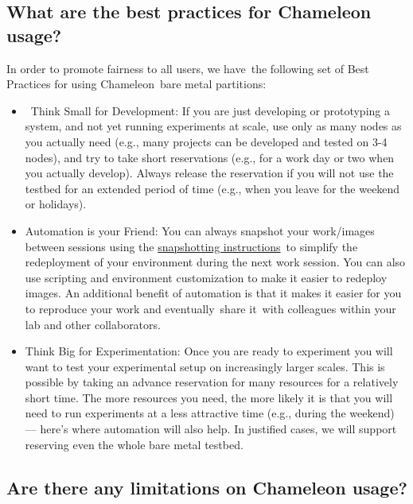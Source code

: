 \subsection{What are the best practices for Chameleon
usage?}\label{what-are-the-best-practices-for-chameleon-usage}

In order to promote fairness to all users, we have~the following set of
Best Practices for using Chameleon~bare metal partitions:

\begin{itemize}
\tightlist
\item
  ~Think Small for Development: If you are just developing or
  prototyping a system, and not yet running experiments at scale, use
  only as many nodes as you actually need (e.g., many projects can be
  developed and tested on 3-4 nodes), and try to take short reservations
  (e.g., for a work day or two when you actually develop). Always
  release the reservation if you will not use the testbed for an
  extended period of time (e.g., when you leave for the weekend or
  holidays).~
\item
  Automation is your Friend: You can always snapshot your work/images
  between sessions using the
  \href{https://www.chameleoncloud.org/docs/user-guides/ironic/\#snapshotting_an_instance}{snapshotting
  instructions}~to simplify the redeployment of your environment during
  the next work session. You can also use scripting and environment
  customization to make it easier to redeploy images. An additional
  benefit of automation is that it makes it easier for you to reproduce
  your work and eventually~share it~with colleagues within your lab and
  other collaborators.
\item
  Think Big for Experimentation: Once you are ready to experiment you
  will want to test your experimental setup on increasingly larger
  scales. This is possible by taking an advance reservation for many
  resources for a relatively short time. The more resources you need,
  the more likely it is that you will need to run experiments at a less
  attractive time (e.g., during the weekend) --- here's where automation
  will also help. In justified cases, we will support reserving even the
  whole bare metal testbed.
\end{itemize}

\subsection{Are there any limitations on Chameleon
usage?}\label{are-there-any-limitations-on-chameleon-usage}

